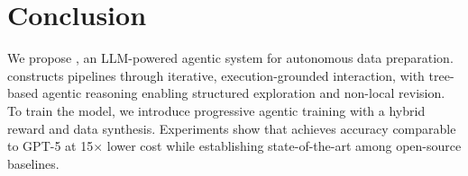 \section{Conclusion}
\label{sec:conclusion}
We propose \sys, an LLM-powered agentic system for autonomous data preparation. \sys constructs pipelines through iterative, execution-grounded interaction, with tree-based agentic reasoning enabling structured exploration and non-local revision. To train the model, we introduce progressive agentic training with a hybrid reward and data synthesis. Experiments show that \sys achieves accuracy comparable to GPT-5 at 15$\times$ lower cost while establishing state-of-the-art among open-source baselines. 


